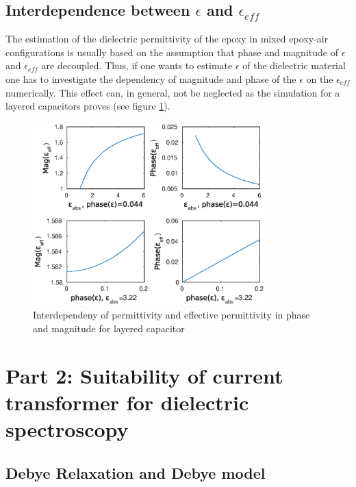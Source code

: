\subsection{Interdependence between $\epsilon$ and $\epsilon_{eff}$} 
The estimation of the dielectric permittivity of the epoxy in mixed epoxy-air configurations is usually based on the assumption that phase and magnitude of $\epsilon$ and $\epsilon_{eff}$ are decoupled. Thus, if one wants to estimate $\epsilon$ of the dielectric material one has to investigate the dependency of magnitude and phase of the $\epsilon$ on the $\epsilon_{eff}$ numerically. This effect can, in general, not be neglected as the simulation for a layered capacitors proves (see figure \ref{fig.layered}).  
\begin{figure}

	\includegraphics[width=0.8\textwidth]{figures/Theory/layeredepsilon.eps}
	\caption[Kurze Abbildungsbeschreibung]{Interdependeny of permittivity and effective permittivity in phase and magnitude for layered capacitor}
	\label{fig.layered}
\end{figure}
	
	
\section{Part 2: Suitability of current transformer for dielectric spectroscopy}
\subsection{Debye Relaxation and Debye model}


